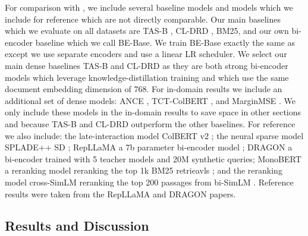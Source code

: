 \documentclass[sigconf,]{acmart}
\begin{document}
For comparison with \name{}, we include several baseline models and models which we include for reference which are not directly comparable. Our main baselines which we evaluate on all datasets are TAS-B \cite{TAS-B}, CL-DRD \cite{CL-DRD}, BM25, and our own bi-encoder baseline which we call BE-Base. We train BE-Base exactly the same as \name{} except we use separate encoders and use a linear LR scheduler. We select our main dense baselines TAS-B and CL-DRD as they are both strong bi-encoder models which leverage knowledge-distillation training and which use the same document embedding dimension of 768. For in-domain results we include an additional set of dense models: ANCE \cite{ANCE}, TCT-ColBERT \cite{TCT-ColBERT}, and MarginMSE \cite{MarginMSE}. We only include these models in the in-domain results to save space in other sections and because TAS-B and CL-DRD outperform the other baselines. For reference we also include: the late-interaction model ColBERT v2 \cite{colbert_v2}; the neural sparse model SPLADE++ SD \cite{SPLADE++}; RepLLaMA a 7b parameter bi-encoder model \cite{RepLlama}; DRAGON a bi-encoder trained with 5 teacher models and 20M synthetic queries; MonoBERT a reranking model reranking the top 1k BM25 retrieavls \cite{MonoBERT}; and the reranking model cross-SimLM reranking the top 200 passages from bi-SimLM \cite{SimLM}. Reference results were taken from the RepLLaMA \cite{RepLlama} and DRAGON \cite{DRAGON} papers.


\subsection{Results and Discussion}
\end{document}
